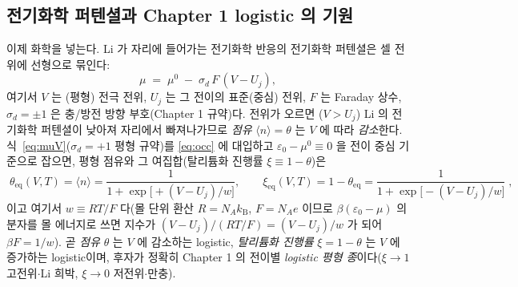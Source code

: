 \documentclass[11pt,a4paper]{article}
\newcommand{\eq}{\mathrm{eq}}
\newcommand{\kB}{k_{\mathrm B}}
\newcommand{\avg}[1]{\langle #1\rangle}
\begin{document}
\subsection{전기화학 퍼텐셜과 Chapter 1 logistic 의 기원}\label{ssec:logistic}
이제 화학을 넣는다. Li 가 자리에 들어가는 전기화학 반응의 전기화학 퍼텐셜은 셀 전위에 선형으로 묶인다:
\begin{equation}
\mu \;=\; \mu^0 \;-\; \sigma_d\,F\,(V-U_j),
\label{eq:muV}
\end{equation}
여기서 $V$ 는 (평형) 전극 전위, $U_j$ 는 그 전이의 표준(중심) 전위, $F$ 는 Faraday 상수, $\sigma_d=\pm1$ 은
충/방전 방향 부호(Chapter 1 규약)다. 전위가 오르면 ($V>U_j$) Li 의 전기화학 퍼텐셜이 낮아져 자리에서
빠져나가므로 \emph{점유} $\avg{n}=\theta$ 는 $V$ 에 따라 \emph{감소}한다. 식~\eqref{eq:muV}($\sigma_d=+1$ 평형
규약)를 \eqref{eq:occ} 에 대입하고 $\varepsilon_0-\mu^0\equiv0$ 을 전이 중심 기준으로 잡으면, 평형 점유와 그
여집합(탈리튬화 진행률 $\xi\equiv1-\theta$)은
\begin{equation}
\boxed{\;\theta_\eq(V,T)=\avg{n}=\frac{1}{1+\exp\!\bigl[+(V-U_j)/w\bigr]},\qquad
\xi_\eq(V,T)=1-\theta_\eq=\frac{1}{1+\exp\!\bigl[-(V-U_j)/w\bigr]}\;,}
\label{eq:logistic}
\end{equation}
이고 여기서 $w\equiv RT/F$ 다(몰 단위 환산 $R=N_A\kB$, $F=N_A e$ 이므로 $\beta(\varepsilon_0-\mu)$ 의 분자를
몰 에너지로 쓰면 지수가 $(V-U_j)/(RT/F)=(V-U_j)/w$ 가 되어 $\beta F=1/w$). 곧 \emph{점유} $\theta$ 는 $V$ 에
감소하는 logistic, \emph{탈리튬화 진행률} $\xi=1-\theta$ 는 $V$ 에 증가하는 logistic이며, 후자가 정확히
Chapter 1 의 전이별 \emph{logistic 평형 종}이다($\xi\to1$ 고전위$\cdot$Li 희박, $\xi\to0$ 저전위$\cdot$만충).
\end{document}
